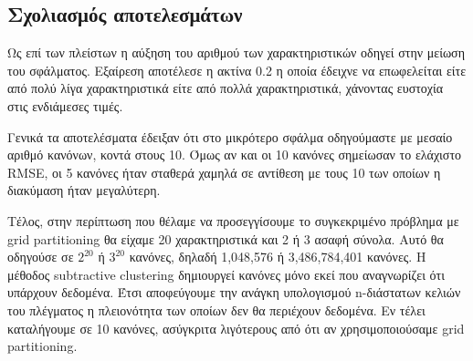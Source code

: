 \documentclass[12pt]{report}
\begin{document}
\subsection{Σχολιασμός αποτελεσμάτων}
Ως επί των πλείστων η αύξηση του αριθμού των χαρακτηριστικών οδηγεί στην μείωση του σφάλματος. Εξαίρεση αποτέλεσε η ακτίνα 0.2 η οποία έδειχνε να επωφελείται είτε από πολύ λίγα χαρακτηριστικά είτε από πολλά χαρακτηριστικά, χάνοντας ευστοχία στις ενδιάμεσες τιμές.

Γενικά τα αποτελέσματα έδειξαν ότι στο μικρότερο σφάλμα οδηγούμαστε με μεσαίο αριθμό κανόνων, κοντά στους 10. Όμως αν και οι 10 κανόνες σημείωσαν το ελάχιστο RMSE, οι 5 κανόνες ήταν σταθερά χαμηλά σε αντίθεση με τους 10 των οποίων η διακύμαση ήταν μεγαλύτερη.

Τέλος, στην περίπτωση που θέλαμε να προσεγγίσουμε το συγκεκριμένο πρόβλημα με grid partitioning θα είχαμε 20 χαρακτηριστικά και 2 ή 3 ασαφή σύνολα. Αυτό θα οδηγούσε σε $2^{20}$ ή $3^{20}$ κανόνες, δηλαδή 1,048,576 ή 3,486,784,401 κανόνες. Η μέθοδος subtractive clustering δημιουργεί κανόνες μόνο εκεί που αναγνωρίζει ότι υπάρχουν δεδομένα. Έτσι αποφεύγουμε την ανάγκη υπολογισμού n-διάστατων κελιών του πλέγματος η πλειονότητα των οποίων δεν θα περιέχουν δεδομένα. Εν τέλει καταλήγουμε σε 10 κανόνες, ασύγκριτα λιγότερους από ότι αν χρησιμοποιούσαμε grid partitioning.
\end{document}
